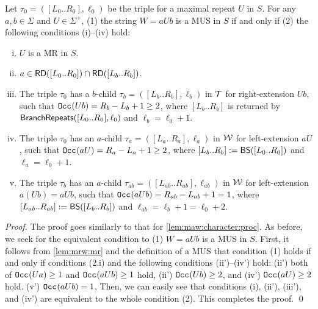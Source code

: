 \begin{lemma}\label{lem:mus:character:proc}
  Let $\tau_0 = ([L_0..R_0], \ell_0)$ be the triple for a maximal repeat $U$ in $S$. For any $a,b \in \Sigma$ and $U\in \Sigma^+$, (1) the string $W = aUb$ is a MUS in $S$ if and only if (2) the following conditions (i)--(iv) hold: 
    \begin{enumerate}[(i)]
    \item $U$ is a MR in $S$.
      
    \item $a \in \mbox{\textsf{RD}}([L_0..R_0]) \cap \mbox{\textsf{RD}}([L_b..R_b])$. 
    \item The triple $\tau_0$ has a $b$-child $\tau_b = ([L_b..R_b], \ell_b)$ in $\mathcal{T}$ for right-extension $Ub$,
      such that $\mathtt{Occ}_{}(Ub) = R_b - L_b + 1 \ge 2$,
      where $[L_b..R_b]$ is returned by $\mbox{\textsf{BranchRepeats}}([L_0..R_0], \ell_0)$ and $\ell_b = \ell_0 + 1$. 

    \item The triple $\tau_0$ has an $a$-child $\tau_a = ([L_a..R_a], \ell_a)$ in $\mathcal{W}$ for left-extension $aU$, 
      such that $\mathtt{Occ}_{}(aU) = R_a - L_a + 1 \ge 2$, 
      where $[L_b..R_b] := \mbox{\textsf{BS}}([L_0..R_0])$ and $\ell_a = \ell_0 + 1$. 
    \item The triple $\tau_b$ has an $a$-child $\tau_{ab} = ([L_{ab}..R_{ab}], \ell_{ab})$ in $\mathcal{W}$ for left-extension $a(Ub) = aUb$,
      such that $\mathtt{Occ}_{}(aUb) = R_{ab} - L_{ab} + 1 = 1$, 
      where $[L_{ab}..R_{ab}] := \mbox{\textsf{BS}}([L_b..R_b])$ and $\ell_{ab} = \ell_b + 1 = \ell_0 + 2$. 
    \end{enumerate}
\end{lemma}

\begin{proof}
  The proof goes similarly to that for \cref{lem:maw:character:proc}. 
  As before, we seek for the equivalent condition to (1) $W = aUb$ is a MUS in $S$. 
  First, it follows from \cref{lem:mrw:mr} and the definition of a MUS that condition (1) holds if and only if conditions (2.i) and the following conditions (ii')--(iv') hold:
  (ii') both of $\mathtt{Occ}_{}(Ua)\ge 1$ and $\mathtt{Occ}_{}(aUb)\ge 1$ hold, 
  (ii') $\mathtt{Occ}_{}(Ub) \ge 2$,  and
  (iv') $\mathtt{Occ}_{}(aU) \ge 2$ hold. 
  (v') $\mathtt{Occ}_{}(aUb) = 1$,
  Then, we can easily see that conditions (i), (ii'), (iii'), and (iv') are equivalent to the whole condition (2). This completes the proof.
  \qed
\end{proof}

